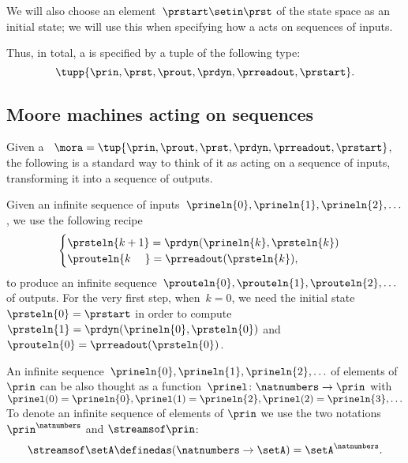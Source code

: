 We will also choose an element~$\prstart \setin \prst$ of the state space as an initial state; we will use this when specifying how a  acts on sequences of inputs.

Thus, in total, a  is specified by a tuple of the following type:
\begin{equation}
    \label{eq:moore-tuple}
    \tupp{\prin,\prst,\prout,\prdyn,\prreadout,\prstart}.
\end{equation}


\subsection{Moore machines acting on sequences}

Given a ~$\mora = \tup{\prin, \prout, \prst, \prdyn, \prreadout, \prstart}$, the following is a standard way to think of it as acting on a sequence of inputs, transforming it into a sequence of outputs.

Given an infinite sequence of inputs~$\prineln{0}, \prineln{1}, \prineln{2}, \ldots $, we use the following recipe
\begin{equation}
    \label{eq:Moore-action-recursion}
    \begin{cases}
        \prsteln{k+1} = \prdyn(\prineln{k}, \prsteln{k}) \\
        \prouteln{k\phantom{+1}}   = \prreadout(\prsteln{k}),
    \end{cases}
\end{equation}
to produce an infinite sequence~$\prouteln{0}, \prouteln{1}, \prouteln{2}, \ldots$ of outputs.
For the very first step, when~$k = 0$, we need the initial state~$\prsteln{0} = \prstart$ in order to compute~$\prsteln{1} = \prdyn(\prineln{0}, \prsteln{0})$ and~$\prouteln{0} = \prreadout(\prsteln{0})$.


An infinite sequence~$\prineln{0}, \prineln{1}, \prineln{2}, \ldots$ of elements of~$\prin$ can be also thought as a function~$\prinel \colon \natnumbers \to \prin$ with~$\prinel(0) = \prineln{0}, \prinel(1) = \prineln{2}, \prinel(2) = \prineln{3}, \ldots$ \etc
To denote an infinite sequence of elements of $\prin$ we use the two notations $\prin^{\natnumbers}$ and $\streamsof\prin$:
\begin{equation}
    \streamsof \setA \definedas  (\natnumbers \to \setA) = \setA^{\natnumbers}.
\end{equation}

